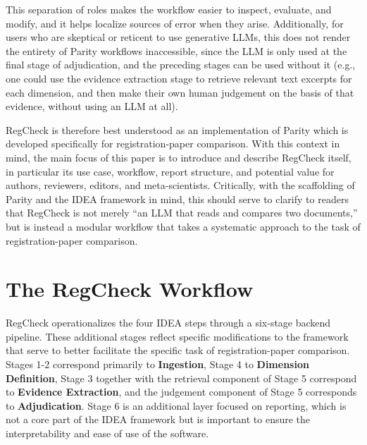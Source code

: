 \documentclass{article}
\begin{document}
This separation of roles makes the workflow easier to inspect, evaluate, and modify, and it helps localize sources of error when they arise. Additionally, for users who are skeptical or reticent to use generative LLMs, this does not render the entirety of Parity workflows inaccessible, since the LLM is only used at the final stage of adjudication, and the preceding stages can be used without it (e.g., one could use the evidence extraction stage to retrieve relevant text excerpts for each dimension, and then make their own human judgement on the basis of that evidence, without using an LLM at all).

RegCheck is therefore best understood as an implementation of Parity which is developed specifically for registration-paper comparison. With this context in mind, the main focus of this paper is to introduce and describe RegCheck itself, in particular its use case, workflow, report structure, and potential value for authors, reviewers, editors, and meta-scientists. Critically, with the scaffolding of Parity and the IDEA framework in mind, this should serve to clarify to readers that RegCheck is not merely ``an LLM that reads and compares two documents,'' but is instead a modular workflow that takes a systematic approach to the task of registration-paper comparison.

\section{The RegCheck Workflow}
RegCheck operationalizes the four IDEA steps through a six-stage backend pipeline. These additional stages reflect specific modifications to the framework that serve to better facilitate the specific task of registration-paper comparison. Stages 1-2 correspond primarily to \textbf{Ingestion}, Stage 4 to \textbf{Dimension Definition}, Stage 3 together with the retrieval component of Stage 5 correspond to \textbf{Evidence Extraction}, and the judgement component of Stage 5 corresponds to \textbf{Adjudication}. Stage 6 is an additional layer focused on reporting, which is not a core part of the IDEA framework but is important to ensure the interpretability and ease of use of the software.
\end{document}
